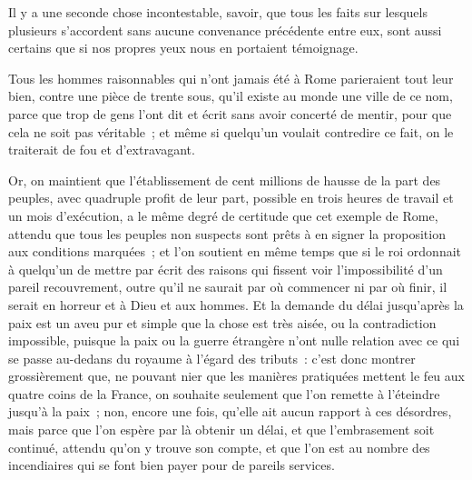 \documentclass[french,twoside]{book} %
\begin{document}
Il y a une seconde chose incontestable, savoir, que tous les faits sur lesquels plusieurs s’accordent sans aucune convenance précédente entre eux, sont aussi certains que si nos propres yeux nous en portaient témoignage.\par
Tous les hommes raisonnables qui n’ont jamais été à Rome parieraient tout leur bien, contre une pièce de trente sous, qu’il existe au monde une ville de ce nom, parce que trop de gens l’ont dit et écrit sans avoir concerté de mentir, pour que cela ne soit pas véritable ; et même si quelqu’un voulait contredire ce fait, on le traiterait de fou et d’extravagant.\par
Or, on maintient que l’établissement de cent millions de hausse de la part des peuples, avec quadruple profit de leur part, possible en trois heures de travail et un mois d’exécution, a le même degré de certitude que cet exemple de Rome, attendu que tous les peuples non suspects sont prêts à en signer la proposition aux conditions marquées ; et l’on soutient en même temps que si le roi ordonnait à quelqu’un de mettre par écrit des raisons qui fissent voir l’impossibilité d’un pareil recouvrement, outre qu’il ne saurait par où commencer ni par où finir, il serait en horreur et à Dieu et aux hommes. Et la demande du délai jusqu’après la paix est un aveu pur et simple que la chose est très aisée, ou la contradiction impossible, puisque la paix ou la guerre étrangère n’ont nulle relation avec ce qui se passe au-dedans du royaume à l’égard des tributs : c’est donc montrer grossièrement que, ne pouvant nier que les manières pratiquées mettent le feu aux quatre coins de la France, on souhaite seulement que l’on remette à l’éteindre jusqu’à la paix ; non, encore une fois, qu’elle ait aucun rapport à ces désordres, mais parce que l’on espère par là obtenir un délai, et que l’embrasement soit continué, attendu qu’on y trouve son compte, et que l’on est au nombre des incendiaires qui se font bien payer pour de pareils services.\par
\end{document}
